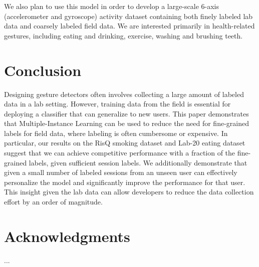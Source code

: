 \documentclass{sigchi}
\begin{document}
We also plan to use this model in order to develop a large-scale 6-axis (accelerometer and gyroscope) activity dataset containing both finely labeled lab data and coarsely labeled field data. We are interested primarily in health-related gestures, including eating and drinking, exercise, washing and brushing teeth.

\section{Conclusion}

Designing gesture detectors often involves collecting a large amount of labeled data in a lab setting. However, training data from the field is essential for deploying a classifier that can generalize to new users. This paper demonstrates that Multiple-Instance Learning can be used to reduce the need for fine-grained labels for field data, where labeling is often cumbersome or expensive. In particular, our results on the RisQ smoking dataset and Lab-20 eating dataset suggest that we can achieve competitive performance with a fraction of the fine-grained labels, given sufficient session labels. We additionally demonstrate that given a small number of labeled sessions from an unseen user can effectively personalize the model and significantly improve the performance for that user. This insight given the lab data can allow developers to reduce the data collection effort by an order of magnitude.

\section{Acknowledgments}

...

%
%
%
%
%
\balance{}

\balance{}



\end{document}
